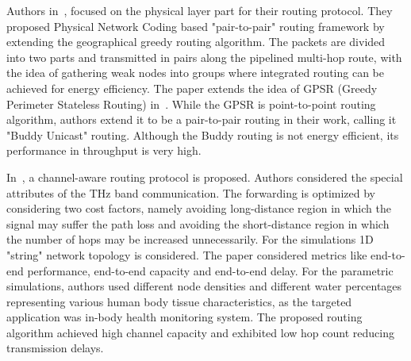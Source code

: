 \documentclass[12pt, oneandhalf, chaparabic, sees, ms]{metu}
\begin{document}
%

%

Authors in~\cite{zhou2012}, focused on the physical layer part for their routing protocol. They proposed Physical Network Coding based
"pair-to-pair" routing framework by extending the geographical greedy routing algorithm. The packets are divided into two parts 
and transmitted in pairs along the pipelined multi-hop route, with the idea of gathering weak nodes into groups where integrated routing can be
achieved for energy efficiency. The paper extends the idea of GPSR (Greedy Perimeter Stateless Routing) in~\cite{karp2000}. While the GPSR 
is point-to-point routing algorithm, authors extend it to be a pair-to-pair routing in their work, calling it "Buddy Unicast" routing.
Although the Buddy routing is not energy efficient, its performance in throughput is very high.


In~\cite{yu2015}, a channel-aware routing protocol is proposed. Authors considered the special attributes of the THz band communication.
The forwarding is optimized by considering two cost factors, namely avoiding long-distance region in which the signal may suffer the 
path loss and avoiding the short-distance region in which the number of hops may be increased unnecessarily. For the simulations 1D "string"
network topology is considered. The paper considered metrics like end-to-end performance, end-to-end capacity and
end-to-end delay. For the parametric simulations, authors used different node densities and different water percentages representing 
various human body tissue characteristics, as the targeted application was in-body health monitoring system.
The proposed routing algorithm achieved high channel capacity and exhibited low hop count reducing transmission delays.
\end{document}
